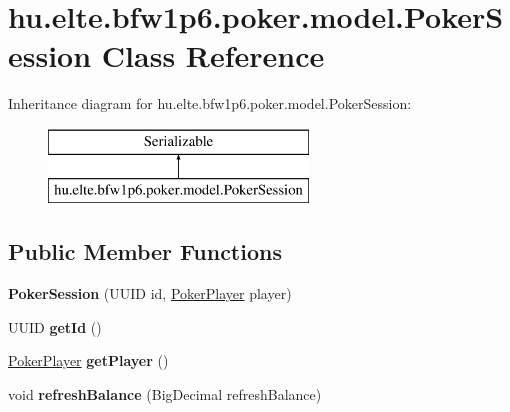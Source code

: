 \hypertarget{classhu_1_1elte_1_1bfw1p6_1_1poker_1_1model_1_1_poker_session}{}\section{hu.\+elte.\+bfw1p6.\+poker.\+model.\+Poker\+Session Class Reference}
\label{classhu_1_1elte_1_1bfw1p6_1_1poker_1_1model_1_1_poker_session}
Inheritance diagram for hu.\+elte.\+bfw1p6.\+poker.\+model.\+Poker\+Session\+:\begin{figure}[H]
\begin{center}
\leavevmode
\includegraphics[height=2.000000cm]{classhu_1_1elte_1_1bfw1p6_1_1poker_1_1model_1_1_poker_session}
\end{center}
\end{figure}
\subsection*{Public Member Functions}
\begin{DoxyCompactItemize}
\item 
\hypertarget{classhu_1_1elte_1_1bfw1p6_1_1poker_1_1model_1_1_poker_session_a2b964e0601e8f1cc879a9e25d6a9e75d}{}{\bfseries Poker\+Session} (U\+U\+I\+D id, \hyperlink{classhu_1_1elte_1_1bfw1p6_1_1poker_1_1model_1_1entity_1_1_poker_player}{Poker\+Player} player)\label{classhu_1_1elte_1_1bfw1p6_1_1poker_1_1model_1_1_poker_session_a2b964e0601e8f1cc879a9e25d6a9e75d}

\item 
\hypertarget{classhu_1_1elte_1_1bfw1p6_1_1poker_1_1model_1_1_poker_session_affb575fcd76f6ec30cc3313d459e40ca}{}U\+U\+I\+D {\bfseries get\+Id} ()\label{classhu_1_1elte_1_1bfw1p6_1_1poker_1_1model_1_1_poker_session_affb575fcd76f6ec30cc3313d459e40ca}

\item 
\hypertarget{classhu_1_1elte_1_1bfw1p6_1_1poker_1_1model_1_1_poker_session_a16631d4a5cfabea621ef6cde97422a1d}{}\hyperlink{classhu_1_1elte_1_1bfw1p6_1_1poker_1_1model_1_1entity_1_1_poker_player}{Poker\+Player} {\bfseries get\+Player} ()\label{classhu_1_1elte_1_1bfw1p6_1_1poker_1_1model_1_1_poker_session_a16631d4a5cfabea621ef6cde97422a1d}

\item 
\hypertarget{classhu_1_1elte_1_1bfw1p6_1_1poker_1_1model_1_1_poker_session_abee77f5701036fccbd788b58c5d17b41}{}void {\bfseries refresh\+Balance} (Big\+Decimal refresh\+Balance)\label{classhu_1_1elte_1_1bfw1p6_1_1poker_1_1model_1_1_poker_session_abee77f5701036fccbd788b58c5d17b41}

\end{DoxyCompactItemize}


